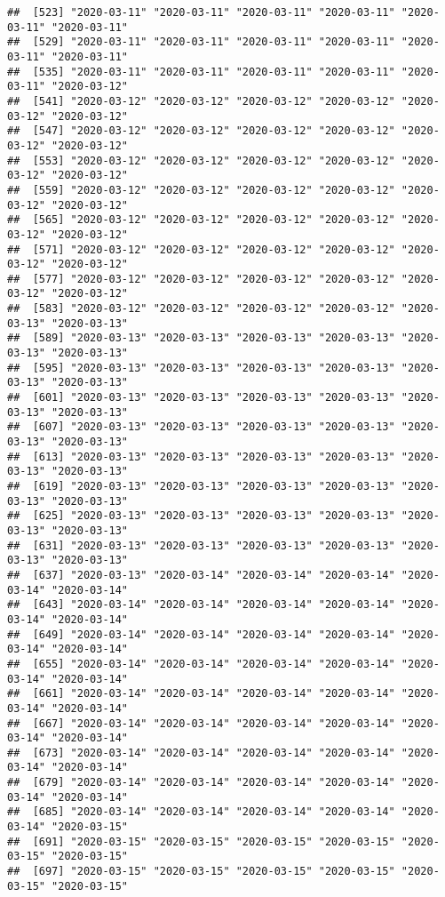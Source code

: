 \documentclass{article}\usepackage[]{graphicx}\usepackage[]{xcolor}
\makeatletter
\newenvironment{kframe}{%
 \def\at@end@of@kframe{}%
 \ifinner\ifhmode%
  \def\at@end@of@kframe{\end{minipage}}%
  \begin{minipage}{\columnwidth}%
 \fi\fi%
 \def\FrameCommand##1{\hskip\@totalleftmargin \hskip-\fboxsep
 \colorbox{shadecolor}{##1}\hskip-\fboxsep
     \hskip-\linewidth \hskip-\@totalleftmargin \hskip\columnwidth}%
 \MakeFramed {\advance\hsize-\width
   \@totalleftmargin\z@ \linewidth\hsize
   \@setminipage}}%
 {\par\unskip\endMakeFramed%
 \at@end@of@kframe}
\newenvironment{knitrout}{}{} %
\makeatother
\begin{document}
\begin{knitrout}
\begin{kframe}
\begin{verbatim}
##  [523] "2020-03-11" "2020-03-11" "2020-03-11" "2020-03-11" "2020-03-11" "2020-03-11"
##  [529] "2020-03-11" "2020-03-11" "2020-03-11" "2020-03-11" "2020-03-11" "2020-03-11"
##  [535] "2020-03-11" "2020-03-11" "2020-03-11" "2020-03-11" "2020-03-11" "2020-03-12"
##  [541] "2020-03-12" "2020-03-12" "2020-03-12" "2020-03-12" "2020-03-12" "2020-03-12"
##  [547] "2020-03-12" "2020-03-12" "2020-03-12" "2020-03-12" "2020-03-12" "2020-03-12"
##  [553] "2020-03-12" "2020-03-12" "2020-03-12" "2020-03-12" "2020-03-12" "2020-03-12"
##  [559] "2020-03-12" "2020-03-12" "2020-03-12" "2020-03-12" "2020-03-12" "2020-03-12"
##  [565] "2020-03-12" "2020-03-12" "2020-03-12" "2020-03-12" "2020-03-12" "2020-03-12"
##  [571] "2020-03-12" "2020-03-12" "2020-03-12" "2020-03-12" "2020-03-12" "2020-03-12"
##  [577] "2020-03-12" "2020-03-12" "2020-03-12" "2020-03-12" "2020-03-12" "2020-03-12"
##  [583] "2020-03-12" "2020-03-12" "2020-03-12" "2020-03-12" "2020-03-13" "2020-03-13"
##  [589] "2020-03-13" "2020-03-13" "2020-03-13" "2020-03-13" "2020-03-13" "2020-03-13"
##  [595] "2020-03-13" "2020-03-13" "2020-03-13" "2020-03-13" "2020-03-13" "2020-03-13"
##  [601] "2020-03-13" "2020-03-13" "2020-03-13" "2020-03-13" "2020-03-13" "2020-03-13"
##  [607] "2020-03-13" "2020-03-13" "2020-03-13" "2020-03-13" "2020-03-13" "2020-03-13"
##  [613] "2020-03-13" "2020-03-13" "2020-03-13" "2020-03-13" "2020-03-13" "2020-03-13"
##  [619] "2020-03-13" "2020-03-13" "2020-03-13" "2020-03-13" "2020-03-13" "2020-03-13"
##  [625] "2020-03-13" "2020-03-13" "2020-03-13" "2020-03-13" "2020-03-13" "2020-03-13"
##  [631] "2020-03-13" "2020-03-13" "2020-03-13" "2020-03-13" "2020-03-13" "2020-03-13"
##  [637] "2020-03-13" "2020-03-14" "2020-03-14" "2020-03-14" "2020-03-14" "2020-03-14"
##  [643] "2020-03-14" "2020-03-14" "2020-03-14" "2020-03-14" "2020-03-14" "2020-03-14"
##  [649] "2020-03-14" "2020-03-14" "2020-03-14" "2020-03-14" "2020-03-14" "2020-03-14"
##  [655] "2020-03-14" "2020-03-14" "2020-03-14" "2020-03-14" "2020-03-14" "2020-03-14"
##  [661] "2020-03-14" "2020-03-14" "2020-03-14" "2020-03-14" "2020-03-14" "2020-03-14"
##  [667] "2020-03-14" "2020-03-14" "2020-03-14" "2020-03-14" "2020-03-14" "2020-03-14"
##  [673] "2020-03-14" "2020-03-14" "2020-03-14" "2020-03-14" "2020-03-14" "2020-03-14"
##  [679] "2020-03-14" "2020-03-14" "2020-03-14" "2020-03-14" "2020-03-14" "2020-03-14"
##  [685] "2020-03-14" "2020-03-14" "2020-03-14" "2020-03-14" "2020-03-14" "2020-03-15"
##  [691] "2020-03-15" "2020-03-15" "2020-03-15" "2020-03-15" "2020-03-15" "2020-03-15"
##  [697] "2020-03-15" "2020-03-15" "2020-03-15" "2020-03-15" "2020-03-15" "2020-03-15"

\end{verbatim}
\end{kframe}
\end{knitrout}
\end{document}

